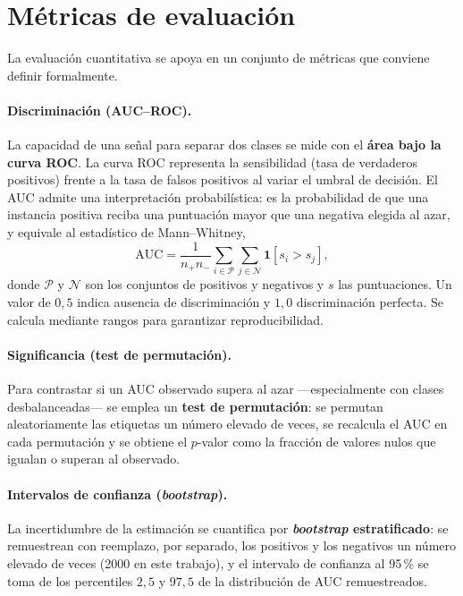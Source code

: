 \section{Métricas de evaluación}
La evaluación cuantitativa se apoya en un conjunto de métricas que conviene definir formalmente.

\paragraph{Discriminación (AUC--ROC).} La capacidad de una señal para separar dos clases se mide con el
\textbf{área bajo la curva ROC}. La curva ROC representa la sensibilidad (tasa de verdaderos positivos)
frente a la tasa de falsos positivos al variar el umbral de decisión. El AUC admite una interpretación
probabilística: es la probabilidad de que una instancia positiva reciba una puntuación mayor que una
negativa elegida al azar, y equivale al estadístico de Mann--Whitney,
\begin{equation}
\mathrm{AUC} = \frac{1}{n_{+}n_{-}}\sum_{i\in\mathcal{P}}\sum_{j\in\mathcal{N}} \mathbf{1}[s_i > s_j],
\end{equation}
donde $\mathcal{P}$ y $\mathcal{N}$ son los conjuntos de positivos y negativos y $s$ las puntuaciones.
Un valor de $0{,}5$ indica ausencia de discriminación y $1{,}0$ discriminación perfecta. Se calcula
mediante rangos para garantizar reproducibilidad.

\paragraph{Significancia (test de permutación).} Para contrastar si un AUC observado supera al azar
—especialmente con clases desbalanceadas— se emplea un \textbf{test de permutación}: se permutan
aleatoriamente las etiquetas un número elevado de veces, se recalcula el AUC en cada permutación y se
obtiene el $p$-valor como la fracción de valores nulos que igualan o superan al observado.

\paragraph{Intervalos de confianza (\textit{bootstrap}).} La incertidumbre de la estimación se cuantifica
por \textbf{\textit{bootstrap} estratificado}: se remuestrean con reemplazo, por separado, los
positivos y los negativos un número elevado de veces (2000 en este trabajo), y el intervalo de
confianza al 95\,\% se toma de los percentiles $2{,}5$ y $97{,}5$ de la distribución de AUC
remuestreados.

